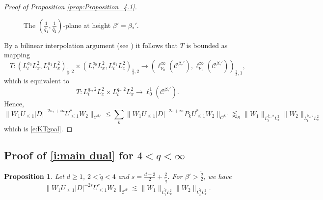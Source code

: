 \documentclass[a4paper]{amsart}
\numberwithin{equation}{section}%
\theoremstyle{plain}%
\newtheorem{proposition}[theorem]{Proposition}
\theoremstyle{definition}
\theoremstyle{remark}%
\def\C{\mathcal{C}}
\def\C{\mathcal{C}}
\begin{document}
\begin{proof}[Proof of Proposition \ref{prop:Proposition_4.1}]
\begin{figure}[t]
\begin{center}
\begin{tikzpicture}[scale=8]
\end{tikzpicture}
\caption{
The $(\frac{1}{\widetilde{q_1}},\frac{1}{\widetilde{q_2}})$-plane at height $\beta'=\beta_*'$.
}\label{f:nbh}
\end{center}
\end{figure}
By a bilinear interpolation argument (see \cite[Exercise 5 (b)]{BL76}) it follows that $T$ is bounded as mapping
\[
T :(L_t^{a_0}L_x^2, L_t^{a_1}L_x^2)_{\frac{1}{3},2} \times(L_t^{a_0}L_x^2, L_t^{a_1}L_x^2)_{\frac{1}{3},2}
\to
(\ell_{\nu_0}^\infty(\C^{\beta_*'}),\ell_{\nu_1}^\infty(\C^{\beta_*'}))_{\frac{2}{3},1},
\]
which is equivalent to 
\[
T:L_t^{\widetilde{q_*},2}L_x^2\times L_t^{\widetilde{q_*},2}L_x^2\to\ell_0^1(\C^{\beta_*'}).
\]
Hence,
\[
\|W_1U_{\leq 1}|D|^{-2s_*+i\kappa}U_{\leq 1}^*W_2\|_{\C^{\beta_*'}}
\leq
\sum_{k}\|W_1U_{\leq 1}|D|^{-2s+i\kappa}P_kU_{\leq 1}^* W_2\|_{\C^{\beta_*'}}
\lessapprox_\kappa
\|W_1\|_{L_t^{\widetilde{q_*},2}L_x^2}\|W_2\|_{L_t^{\widetilde{q_*},2}L_x^2}
\]
which is \eqref{e:KTgoal}.

\end{proof}


\subsection{Proof of \eqref{i:main dual} for $4 < q < \infty$}

\begin{proposition}\label{proposition:Schatten_LowerHalf}
Let $d \geq 1$, $2< \widetilde{q} < 4$ and $s= \frac{d-2}{2} + \frac{2}{\widetilde{q}}$. For $\beta' > \frac{\widetilde{q}}{2}$, we have
\begin{equation}\label{est:goal-prop4.1}
\| W_1 U_{\leq 1} |D|^{- 2s} U_{\leq 1}^*W_2 \|_{\mathcal{C}^{\beta'}}
\lesssim 
\|W_1 \|_{L_t^{\widetilde{q}} L_x^2} \|W_2 \|_{L_t^{\widetilde{q}} L_x^2}.
\end{equation}
\end{proposition}
\end{document}
